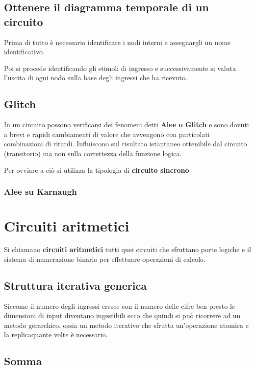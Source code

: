 \documentclass[a4paper]{book}
\begin{document}
\section{Ottenere il diagramma temporale di un circuito}

Prima di tutto è necessario identificare i nodi interni e assegnargli un nome identificativo.

Poi si procede identificando gli stimoli di ingresso e successivamente si valuta l'uscita di ogni nodo sulla base degli ingressi che ha ricevuto.



\section{Glitch}

In un circuito possono verificarsi dei fenomeni detti \textbf{Alee o Glitch} e sono dovuti a brevi e rapidi cambiamenti di valore che avvengono con particolati combinazioni di ritardi. Influiscono sul risultato istantaneo ottenibile dal circuito (transitorio) ma non sulla correttezza della funzione logica.


Per ovviare a ciò si utilizza la tipologia di\textbf{ circuito sincrono}

\subsection{Alee su Karnaugh}

\chapter{Circuiti aritmetici}

Si chiamano \textbf{circuiti aritmetici} tutti quei circuiti che sfruttano porte logiche e il sistema di numerazione binario per effettuare operazioni di calcolo.


\section{Struttura iterativa generica}

Siccome il numero degli ingressi cresce con il numero delle cifre ben presto le dimensioni di input diventano ingestibili ecco che quindi si può ricorrere ad un metodo gerarchico, ossia un metodo iterativo che sfrutta un'operazione atomica e la replicaquante volte è necessario.


\section{Somma}
\end{document}
